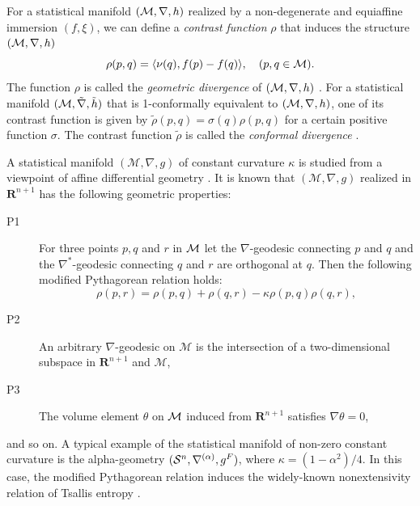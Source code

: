 \documentclass{llncs}
\begin{document}

For a statistical manifold $({\cal M}, \nabla,h)$ realized by 
a non-degenerate and equiaffine immersion $(f,\xi)$, 
we can define a {\em contrast function} $\rho$
that induces the structure $({\cal M}, \nabla,h)$
\[
	\rho(p,q)=\langle \nu(q), f(p)-f(q) \rangle, \quad (p,q \in {\cal M}).
\]
The function $\rho$ is called the {\em geometric divergence} of 
$({\cal M}, \nabla,h)$ \cite{Kurose94}.
For a statistical manifold $({\cal M},\tilde \nabla, \tilde h)$ that is 
1-conformally equivalent to $({\cal M}, \nabla,h)$, one of 
its contrast function is given by $\tilde \rho(p,q)=\sigma(q) \rho(p,q)$ 
for a certain positive function $\sigma$.
The contrast function $\tilde \rho$ is called the 
{\em conformal divergence} \cite{Kurose94}.

A statistical manifold $(\mathcal{M}, \nabla, g)$ of constant
curvature $\kappa$ is studied from a viewpoint of affine differential geometry 
\cite{Kurose94}.
It is known that $(\mathcal{M},\nabla,g)$ realized in $\mathbf{R}^{n+1}$ 
has the following geometric properties:
\begin{description}
 \item[P1] For three points $p,q$ and $r$ in ${\cal M}$ let 
the $\nabla$-geodesic connecting $p$ and $q$ and 
the $\nabla^*$-geodesic connecting $q$ and $r$ are 
orthogonal at $q$. 
Then the following modified Pythagorean relation holds:
\[
	\rho(p,r)=\rho(p,q)+\rho(q,r)-\kappa \rho(p,q)\rho(q,r),
\]
 \item[P2] An arbitrary $\nabla$-geodesic on $\mathcal{M}$ is the intersection of a two-dimensional subspace in $\mathbf{R}^{n+1}$ and $\mathcal{M}$,   
 \item[P3] The volume element $\theta$ on ${\cal M}$ induced 
from $\mathbf{R}^{n+1}$ satisfies $\nabla \theta =0$, 
\end{description}
and so on. 
A typical example of the statistical manifold of non-zero constant curvature 
is the alpha-geometry $({\cal S}^n,\nabla^{(\alpha)},g^F)$, where 
$\kappa=(1-\alpha^2)/4$.
In this case, the modified Pythagorean relation induces 
the widely-known nonextensivity relation of
Tsallis entropy \cite[Remark 2]{Ohara07}. 


\end{document}
